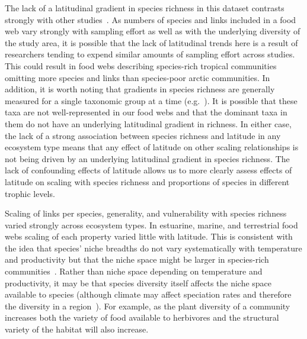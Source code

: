 \documentclass[12pt]{article}
\begin{document}
\begin{spacing}{1.0}
  The lack of a latitudinal gradient in species richness in this dataset contrasts
  strongly with other studies~\citep{Schemske2009,Macpherson2002,Kaufman1995}. As numbers of species and links included in a food web
  vary strongly with sampling effort as well as with the underlying diversity of the study
  area, it is possible that the lack of latitudinal trends here is a result of researchers
  tending to expend similar amounts of sampling effort across studies. This could result in
  food webs describing species-rich tropical communities omitting more species and links
  than species-poor arctic communities. In addition, it is worth noting that gradients in
  species richness are generally measured for a single taxonomic group at a time (e.g.~\citep{Kaufman1995}).
  It is possible that these taxa are not well-represented in our food webs and that the
  dominant taxa in them do not have an underlying latitudinal gradient in richness. 
  In either case, the lack of a strong association between
  species richness and latitude in any ecosystem type
  means that any effect of latitude on other scaling 
  relationships is not being driven by an underlying 
  latitudinal gradient in species richness.
  The lack of confounding effects of latitude allows us to 
  more clearly assess effects of latitude on scaling with 
  species richness and proportions of species in different 
  trophic levels.


  Scaling of links per species, generality, and vulnerability with species
  richness varied strongly across ecosystem types. In estuarine, marine, and
  terrestrial food webs scaling of each property varied little with latitude.
  This is consistent with the idea that species' niche breadths do not vary
  systematically with temperature and productivity but that the niche space
  might be larger in species-rich communities~\citep{Davies2007}. Rather than
  niche space depending on temperature and productivity, it may be that species
  diversity itself affects the niche space available to species (although climate
  may affect speciation rates and therefore the diversity in a region~\citep{Currie2004}). 
  For example, as the plant diversity of a community increases both the 
  variety of food available to herbivores and the structural variety of the habitat will also increase.



\end{spacing}
\end{document}
